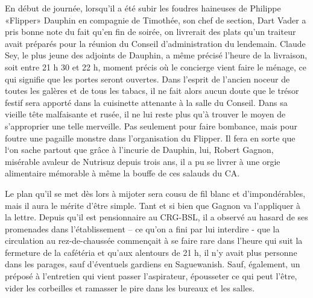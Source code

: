 
En début de journée, lorsqu’il a été subir les foudres haineuses de Philippe «Flipper» Dauphin en compagnie de Timothée, son chef de section, Dart Vader a pris bonne note du fait qu’en fin de soirée, on livrerait des plats qu’un traiteur avait préparés pour la réunion du Conseil d’administration du lendemain. Claude Sey, le plus jeune des adjoints de Dauphin, a même précisé l’heure de la livraison, soit entre 21 h 30 et 22 h, moment précis où le concierge vient faire le ménage, ce qui signifie que les portes seront ouvertes. Dans l’esprit de l’ancien noceur de toutes les galères et de tous les tabacs, il ne fait alors aucun doute que le trésor festif sera apporté dans la cuisinette attenante à la salle du Conseil. Dans sa vieille tête malfaisante et rusée, il ne lui reste plus qu’à trouver le moyen de s’approprier une telle merveille. Pas seulement pour faire bombance, mais pour foutre une pagaille monstre dans l’organisation du Flipper. Il fera en sorte que l‘on sache partout que grâce à l’incurie de Dauphin, lui, Robert Gagnon, misérable avaleur de Nutrisuz depuis trois ans, il a pu se livrer à une orgie alimentaire mémorable à même la bouffe de ces salauds du CA.

Le plan qu’il se met dès lors à mijoter sera cousu de fil blanc et d’impondérables, mais il aura le mérite d’être simple. Tant et si bien que Gagnon va l’appliquer à la lettre. Depuis qu’il est pensionnaire au CRG-BSL, il a observé au hasard de ses promenades dans l’établissement – ce qu’on a fini par lui interdire - que la circulation au rez-de-chaussée commençait à se faire rare dans l’heure qui suit la fermeture de la cafétéria et qu’aux alentours de 21 h, il n’y avait plus personne dans les parages, sauf d’éventuels gardiens en Saguewanish. Sauf, également, un préposé à l’entretien qui vient passer l’aspirateur, épousseter ce qui peut l’être, vider les corbeilles et ramasser le pire dans les bureaux et les salles.

